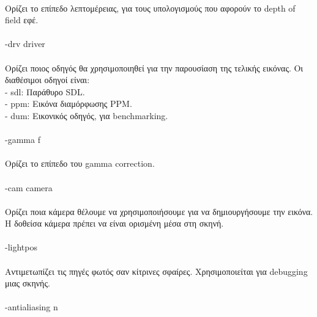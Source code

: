\begin{sloppypar}
\paragraph{}
	Ορίζει το επίπεδο λεπτομέρειας, για τους υπολογισμούς που αφορούν το depth of field εφέ.

\paragraph{}
	-drv driver
\paragraph{}
	Ορίζει ποιος οδηγός θα χρησιμοποιηθεί για την παρουσίαση της τελικής εικόνας. Οι διαθέσιμοι οδηγοί είναι:\\
	- sdl: Παράθυρο SDL.\\
	- ppm: Εικόνα διαμόρφωσης PPM.\\
	- dum: Εικονικός οδηγός, για benchmarking.

\paragraph{}
	-gamma f
\paragraph{}
	Ορίζει το επίπεδο του gamma correction.

\paragraph{}
	-cam camera
\paragraph{}
	Ορίζει ποια κάμερα θέλουμε να χρησιμοποιήσουμε για να δημιουργήσουμε την εικόνα. Η δοθείσα κάμερα πρέπει να είναι
ορισμένη μέσα στη σκηνή.

\paragraph{}
	-lightpos
\paragraph{}
	Αντιμετωπίζει τις πηγές φωτός σαν κίτρινες σφαίρες. Χρησιμοποιείται για debugging μιας σκηνής.

\paragraph{}
	-antialiasing n

\end{sloppypar}
